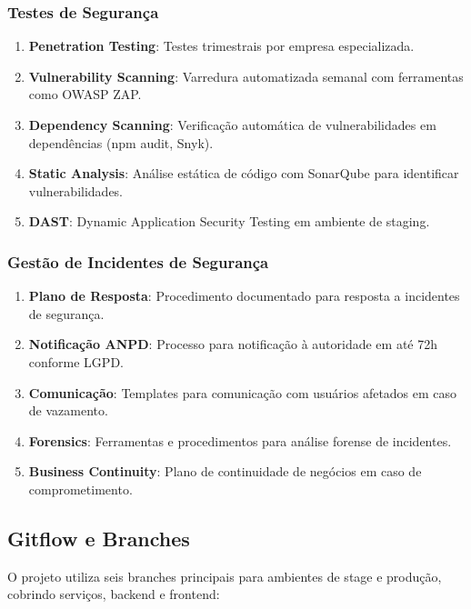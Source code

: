 \documentclass[12pt, a4paper]{article}
\begin{document}
\begin{spacing}{1.5}
\subsubsection{Testes de Segurança}
\begin{spacing}{1.5}
\begin{enumerate}[label=\alph*)]
    \item \textbf{Penetration Testing}: Testes trimestrais por empresa especializada.
    \item \textbf{Vulnerability Scanning}: Varredura automatizada semanal com ferramentas como OWASP ZAP.
    \item \textbf{Dependency Scanning}: Verificação automática de vulnerabilidades em dependências (npm audit, Snyk).
    \item \textbf{Static Analysis}: Análise estática de código com SonarQube para identificar vulnerabilidades.
    \item \textbf{DAST}: Dynamic Application Security Testing em ambiente de staging.
\end{enumerate}
\end{spacing}

\subsubsection{Gestão de Incidentes de Segurança}
\begin{spacing}{1.5}
\begin{enumerate}[label=\alph*)]
    \item \textbf{Plano de Resposta}: Procedimento documentado para resposta a incidentes de segurança.
    \item \textbf{Notificação ANPD}: Processo para notificação à autoridade em até 72h conforme LGPD.
    \item \textbf{Comunicação}: Templates para comunicação com usuários afetados em caso de vazamento.
    \item \textbf{Forensics}: Ferramentas e procedimentos para análise forense de incidentes.
    \item \textbf{Business Continuity}: Plano de continuidade de negócios em caso de comprometimento.
\end{enumerate}
\end{spacing}

\subsection{Gitflow e Branches}
\begin{spacing}{1.5}
O projeto utiliza seis branches principais para ambientes de stage e produção, cobrindo serviços, backend e frontend:


\end{spacing}
\end{spacing}
\end{document}

